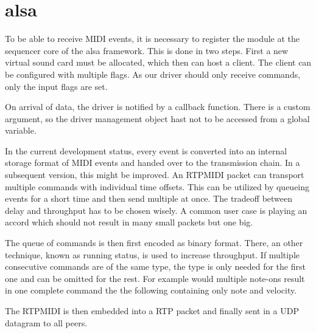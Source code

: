 \documentclass[paper=a4,fontsize=11pt,pagesize,bibtotoc]{scrartcl}
\begin{document}
	\section{alsa}
	
	To be able to receive MIDI events, it is necessary to register the module at the sequencer core of the alsa framework. This is done in two steps. First a new virtual sound card must be allocated, which then can host a client. The client can be configured with multiple flags. As our driver should only receive commands, only the input flags are set.
	
	On arrival of data, the driver is notified by a callback function. There is a custom argument, so the driver management object hast not to be accessed from a global variable.
	
	In the current development status, every event is converted into an internal storage format of MIDI events and handed over to the transmission chain. In a subsequent version, this might be improved. An RTPMIDI packet can transport multiple commands with individual time offsets. This can be utilized by queueing events for a short time and then send multiple at once. The tradeoff between delay and throughput has to be chosen wisely. A common user case is playing an accord which should not result in many small packets but one big.
	
	The queue of commands is then first encoded as binary format. There, an other technique, known as running status, is used to increase throughput. If multiple consecutive commands are of the same type, the type is only needed for the first one and can be omitted for the rest. For example would multiple note-ons result in one complete command the the following containing only note and velocity.
	
	The RTPMIDI is then embedded into a RTP packet and finally sent in a UDP datagram to all peers.
	
	
	
	
	
	
	
	
\end{document}
